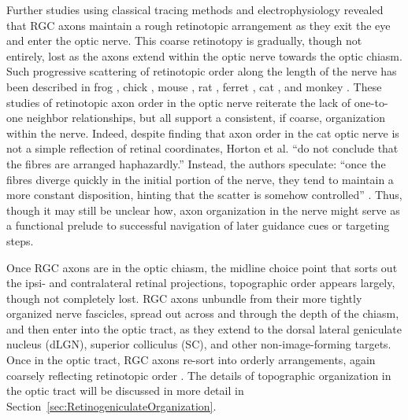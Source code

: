 Further studies using classical tracing methods and electrophysiology revealed that RGC axons maintain a rough retinotopic arrangement as they exit the eye and enter the optic nerve.
This coarse retinotopy is gradually, though not entirely, lost as the axons extend within the optic nerve towards the optic chiasm.
Such progressive scattering of retinotopic order along the length of the nerve has been described in frog \cite{montgomery1998organization}, chick \cite{ehrlich1984course}, mouse \cite{chan1999changes,plas2005pretarget}, rat \cite{chan1994changes,simon1991relationship}, ferret \cite{reese1993reestablishment}, cat \cite{horton1979non,naito1986course}, and monkey \cite{naito1994retinogeniculate}.
These studies of retinotopic axon order in the optic nerve reiterate the lack of one-to-one neighbor relationships, but all support a consistent, if coarse, organization within the nerve.
Indeed, despite finding that axon order in the cat optic nerve is not a simple reflection of retinal coordinates, Horton et al. ``do not conclude that the fibres are arranged haphazardly.''
Instead, the authors speculate: ``once the fibres diverge quickly in the initial portion of the nerve, they tend to maintain a more constant disposition, hinting that the scatter is somehow controlled'' \cite{horton1979non}.
Thus, though it may still be unclear how, axon organization in the nerve might serve as a functional prelude to successful navigation of later guidance cues or targeting steps.

Once RGC axons are in the optic chiasm, the midline choice point that sorts out the ipsi- and contralateral retinal projections, topographic order appears largely, though not completely lost.
RGC axons unbundle from their more tightly organized nerve fascicles, spread out across and through the depth of the chiasm, and then enter into the optic tract, as they extend to the dorsal lateral geniculate nucleus (dLGN), superior colliculus (SC), and other non-image-forming targets.
Once in the optic tract, RGC axons re-sort into orderly arrangements, again coarsely reflecting retinotopic order \cite{chan1999changes,chan1994changes,plas2005pretarget,reese1993reestablishment,reh1983organization,torrealba1982studies}.
The details of topographic organization in the optic tract will be discussed in more detail in Section~\ref{sec:RetinogeniculateOrganization}.

